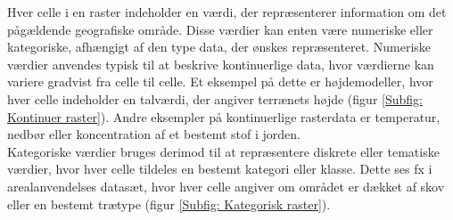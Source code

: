 Hver celle i en raster indeholder en værdi, der repræsenterer information om det pågældende geografiske område. Disse værdier kan enten være numeriske eller kategoriske, afhængigt af den type data, der ønskes repræsenteret. Numeriske værdier anvendes typisk til at beskrive kontinuerlige data, hvor værdierne kan variere gradvist fra celle til celle. Et eksempel på dette er højdemodeller, hvor hver celle indeholder en talværdi, der angiver terrænets højde (figur \ref{Subfig: Kontinuer raster}). Andre eksempler på kontinuerlige rasterdata er temperatur, nedbør eller koncentration af et bestemt stof i jorden. \\
Kategoriske værdier bruges derimod til at repræsentere diskrete eller tematiske værdier, hvor hver celle tildeles en bestemt kategori eller klasse. Dette ses fx i arealanvendelses datasæt, hvor hver celle angiver om området er dækket af skov eller en bestemt trætype (figur \ref{Subfig: Kategorisk raster}).
